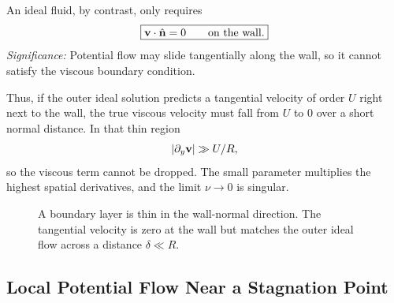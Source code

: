 \documentclass[../main.tex]{subfiles}
\begin{document}
An ideal fluid, by contrast, only requires
\begin{equation}
  \boxed{\mathbf{v}\cdot\hat{\mathbf{n}}=0\qquad\text{on the wall}.}
  \label{eq:lec24_no_penetration}
\end{equation}
\textit{Significance:} Potential flow may slide tangentially along the wall, so
it cannot satisfy the viscous boundary condition.

Thus, if the outer ideal solution predicts a tangential velocity of order $U$
right next to the wall, the true viscous velocity must fall from $U$ to $0$ over
a short normal distance.  In that thin region
\[
  |\partial_y\mathbf{v}|\gg U/R,
\]
so the viscous term cannot be dropped.  The small parameter multiplies the
highest spatial derivatives, and the limit $\nu\to0$ is singular.

\begin{figure}[h]
\centering
{}
\caption{A boundary layer is thin in the wall-normal direction.  The tangential
velocity is zero at the wall but matches the outer ideal flow across a distance
$\delta\ll R$.}
\label{fig:lec24_boundary_layer_sketch}
\end{figure}

\subsection{Local Potential Flow Near a Stagnation Point}\label{sec:lec24:outer-stagnation}
\end{document}
